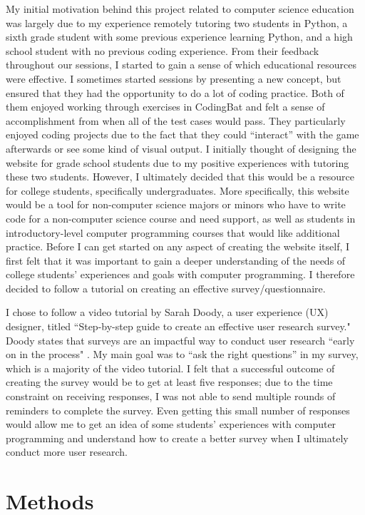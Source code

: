 \documentclass[10pt,twocolumn]{article}
\begin{document}
My initial motivation behind this project related to computer science education was largely due to my experience remotely tutoring two students in Python, a sixth grade student with some previous experience learning Python, and a high school student with no previous coding experience. From their feedback throughout our sessions, I started to gain a sense of which educational resources were effective. I sometimes started sessions by presenting a new concept, but ensured that they had the opportunity to do a lot of coding practice. Both of them enjoyed working through exercises in CodingBat and felt a sense of accomplishment from when all of the test cases would pass. They particularly enjoyed coding projects due to the fact that they could “interact” with the game afterwards or see some kind of visual output. I initially thought of designing the website for grade school students due to my positive experiences with tutoring these two students. However, I ultimately decided that this would be a resource for college students, specifically undergraduates. More specifically, this website would be a tool for non-computer science majors or minors who have to write code for a non-computer science course and need support, as well as students in introductory-level computer programming courses that would like additional practice. Before I can get started on any aspect of creating the website itself, I first felt that it was important to gain a deeper understanding of the needs of college students’ experiences and goals with computer programming. I therefore decided to follow a tutorial on creating an effective survey/questionnaire.

I chose to follow a video tutorial by Sarah Doody, a user experience (UX) designer, titled “Step-by-step guide to create an effective user research survey." Doody states that surveys are an impactful way to conduct user research “early on in the process" \cite{Tutorial}. My main goal was to “ask the right questions” in my survey, which is a majority of the video tutorial. I felt that a successful outcome of creating the survey would be to get at least five responses; due to the time constraint on receiving responses, I was not able to send multiple rounds of reminders to complete the survey. Even getting this small number of responses would allow me to get an idea of some students’ experiences with computer programming and understand how to create a better survey when I ultimately conduct more user research.


\section{Methods}
\end{document}
